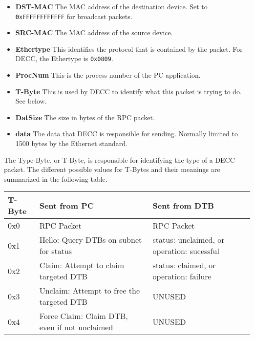 \documentclass{article}
\begin{document}
\begin{itemize}
  \item \textbf{DST-MAC} The MAC address of the destination device. Set to
  \verb!0xFFFFFFFFFFFF! for broadcast packets.
  \item \textbf{SRC-MAC} The MAC address of the source device. 
  \item \textbf{Ethertype} This identifies the protocol that is contained by the
  packet. For DECC, the Ethertype is \verb!0x0809!.
  \item \textbf{ProcNum} This is the process number of the PC application. 
  \item \textbf{T-Byte} This is used by DECC to identify what this packet is
  trying to do. See below.
  \item \textbf{DatSize} The size in bytes of the RPC packet.
  \item \textbf{data} The data that DECC is responsible for sending. Normally
  limited to 1500 bytes by the Ethernet standard.
\end{itemize}

The Type-Byte, or T-Byte, is responsible for identifying the type of a DECC
packet. The different possible values for T-Bytes and their meanings are
summarized in the following table.

\begin{table}[h]
\centering
\begin{tabular}{|l|l|l|} \hline
T-Byte  & Sent from PC     & Sent from DTB \\ \hline 
0x0 & RPC Packet           & RPC Packet \\ \hline
0x1 & Hello: Query DTBs on subnet for status        & status: unclaimed, or
operation: sucessful \\ \hline
0x2 & Claim: Attempt to claim targeted DTB          & status: claimed, or
operation: failure   \\ \hline
0x3 & Unclaim: Attempt to free the targeted DTB     & UNUSED\\ \hline
0x4 & Force Claim: Claim DTB, even if not unclaimed & UNUSED \\ \hline
\end{tabular}
\end{table}
\end{document}
